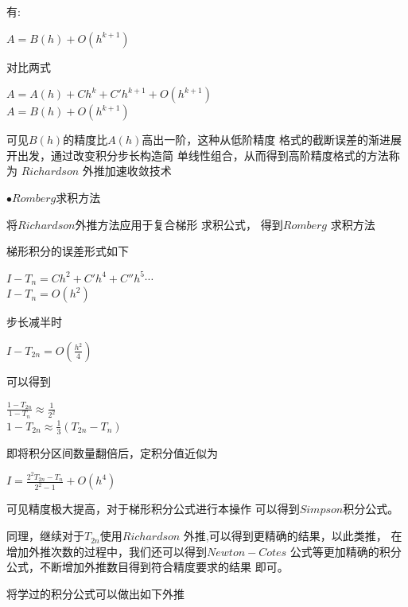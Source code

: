 \documentclass[11pt, a4paper, oneside]{ctexart}
\begin{document}
{{{{{    有:
    \begin{center}
        $A=B(h)+O(h^{k+1})$
    \end{center} 

    对比两式

    \begin{center}
        $A=A(h)+ Ch^k + C'h^{k+1}+O(h^{k+1})$\\
        $A=B(h)+O(h^{k+1})$
    \end{center} 

    可见$B(h)$的精度比$A(h)$高出一阶，这种从低阶精度
    格式的截断误差的渐进展开出发，通过改变积分步长构造简
    单线性组合，从而得到高阶精度格式的方法称为 
    $Richardson$ 外推加速收敛技术
    }

    {
    $\bullet Romberg$求积方法
    \par  将$Richardson$外推方法应用于复合梯形
    求积公式，
    得到$Romberg$ 求积方法
    

    梯形积分的误差形式如下
    \begin{center}
        $I-T_{n}=Ch^2 + C'h^{4}+C''h^{5}\cdots$\\
        $I-T_{n}= O(h^2)$
    \end{center} 
    

    步长减半时
    \begin{center}
        $I-T_{2n}=O(\frac{h^2}{4})$
    \end{center} 
    
    
    可以得到
    \begin{center}
        $\frac{1-T_{2n}}{1-T_{n}}\approx \frac {1}{2^2}$
        \\
        $1-T_{2n} \approx \frac{1}{3}(T_{2n}-T_n)$
    \end{center} 


    即将积分区间数量翻倍后，定积分值近似为
    \begin{center}
        \Large$I=\frac{2^2T_{2n}-T_n}{2^2-1}+O(h^4)$
    \end{center} 


    可见精度极大提高，对于梯形积分公式进行本操作
    可以得到$Simpson$积分公式。

    同理，继续对于$T_{2n}$使用$Richardson$
    外推,可以得到更精确的结果，以此类推，
    在增加外推次数的过程中，我们还可以得到$Newton-Cotes$
    公式等更加精确的积分公式，不断增加外推数目得到符合精度要求的结果
    即可。
    
    
    将学过的积分公式可以做出如下外推

}}}}}
\end{document}
